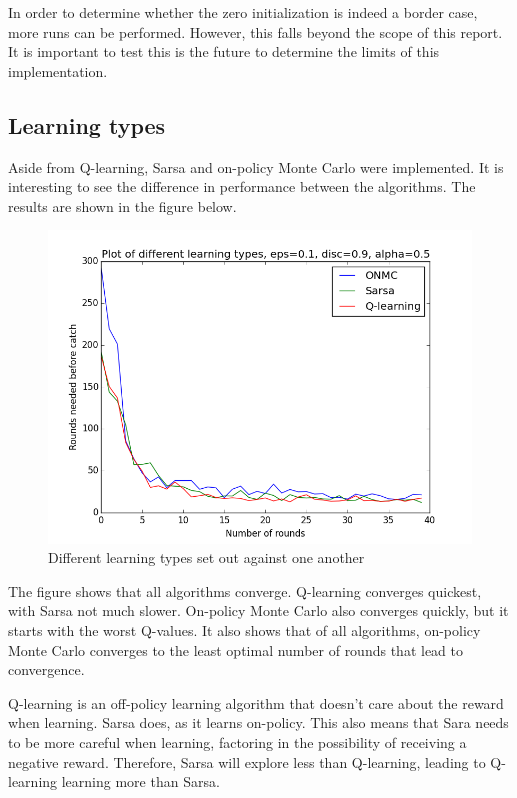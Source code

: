 \documentclass{article}
\begin{document}
In order to determine whether the zero initialization is indeed a border case, more runs can be performed. However, this falls beyond the scope of this report. It is important to test this is the future to determine the limits of this implementation.

\subsection{Learning types}
Aside from Q-learning, Sarsa and on-policy Monte Carlo were implemented. It is interesting to see the difference in performance between the algorithms. The results are shown in the figure below.

\begin{figure}[h]
\begin{center}
	\includegraphics[scale=0.4]{learning_types}
	\caption{Different learning types set out against one another}
	\label{fig:learningalgs}
\end{center}
\end{figure}

The figure shows that all algorithms converge. Q-learning converges quickest, with Sarsa not much slower. On-policy Monte Carlo also converges quickly, but it starts with the worst Q-values. It also shows that of all algorithms, on-policy Monte Carlo converges to the least optimal number of rounds that lead to convergence.

Q-learning is an off-policy learning algorithm that doesn't care about the reward when learning. Sarsa does, as it learns on-policy. This also means that Sara needs to be more careful when learning, factoring in the possibility of receiving a negative reward. Therefore, Sarsa will explore less than Q-learning, leading to Q-learning learning more than Sarsa.
\end{document}
